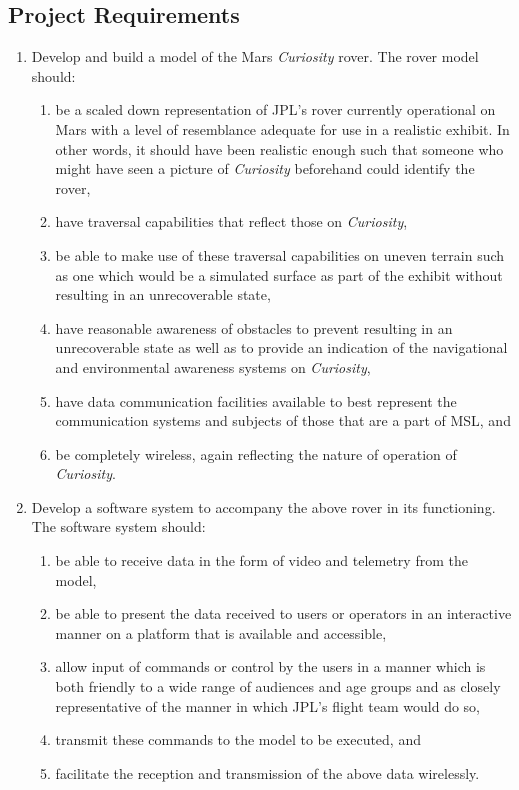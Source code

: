   \subsection{Project Requirements}
  \begin{enumerate}
    \item Develop and build a model of the Mars \textit{Curiosity} rover. The rover model should:
    \begin{enumerate}
      \item\label{enum:req-scaledrover} be a scaled down representation of JPL's rover currently operational on Mars with a level of resemblance adequate for use in a realistic exhibit. In other words, it should have been realistic enough such that someone who might have seen a picture of \textit{Curiosity} beforehand could identify the rover,
      \item have traversal capabilities that reflect those on \textit{Curiosity},
      \item be able to make use of these traversal capabilities on uneven terrain such as one which would be a simulated surface as part of the exhibit without resulting in an unrecoverable state,
      \item have reasonable awareness of obstacles to prevent resulting in an unrecoverable state as well as to provide an indication of the navigational and environmental awareness systems on \textit{Curiosity},
      \item have data communication facilities available to best represent the communication systems and subjects of those that are a part of MSL, and
      \item be completely wireless, again reflecting the nature of operation of \textit{Curiosity}.
    \end{enumerate}
    \item Develop a software system to accompany the above rover in its functioning. The software system should:
    \begin{enumerate}
      \item be able to receive data in the form of video and telemetry from the model,
      \item be able to present the data received to users or operators in an interactive manner on a platform that is available and accessible,
      \item allow input of commands or control by the users in a manner which is both friendly to a wide range of audiences and age groups and as closely representative of the manner in which JPL's flight team would do so,
      \item transmit these commands to the model to be executed, and
      \item facilitate the reception and transmission of the above data wirelessly.
    \end{enumerate}
  \end{enumerate}
  
